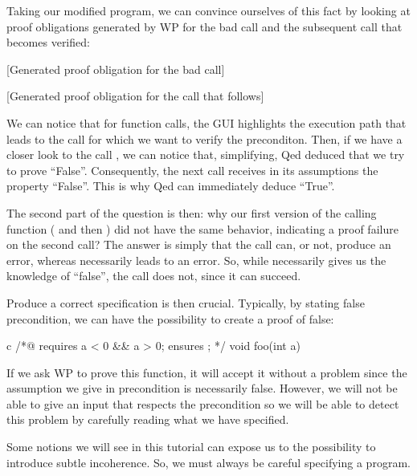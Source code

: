 \documentclass[middle]{zmdocument}
\begin{document}
Taking our modified program, we can convince ourselves of this fact by
looking at proof obligations generated by WP for the bad call and the
subsequent call that becomes verified:



[Generated proof obligation for the bad call]


[Generated proof obligation for the call that follows]


We can notice that for function calls, the GUI highlights the execution
path that leads to the call for which we want to verify the preconditon.
Then, if we have a closer look to the call , we
can notice that, simplifying, Qed deduced that we try to prove
``False''. Consequently, the next call  receives in its
assumptions the property ``False''. This is why Qed can immediately
deduce ``True''.



The second part of the question is then: why our first version of the
calling function ( and then ) did
not have the same behavior, indicating a proof failure on the second
call? The answer is simply that the call  can, or not,
produce an error, whereas  necessarily leads to an
error. So, while  necessarily gives us the
knowledge of ``false'', the call  does not, since it can
succeed.



Produce a correct specification is then crucial. Typically, by stating
false precondition, we can have the possibility to create a proof of
false:



\begin{CodeBlock}{c}
/*@
  requires a < 0 && a > 0;
  ensures  \false;
*/
void foo(int a){

}
\end{CodeBlock}


If we ask WP to prove this function, it will accept it without a problem
since the assumption we give in precondition is necessarily false.
However, we will not be able to give an input that respects the
precondition so we will be able to detect this problem by carefully
reading what we have specified.



Some notions we will see in this tutorial can expose us to the
possibility to introduce subtle incoherence. So, we must always be
careful specifying a program.
\end{document}
